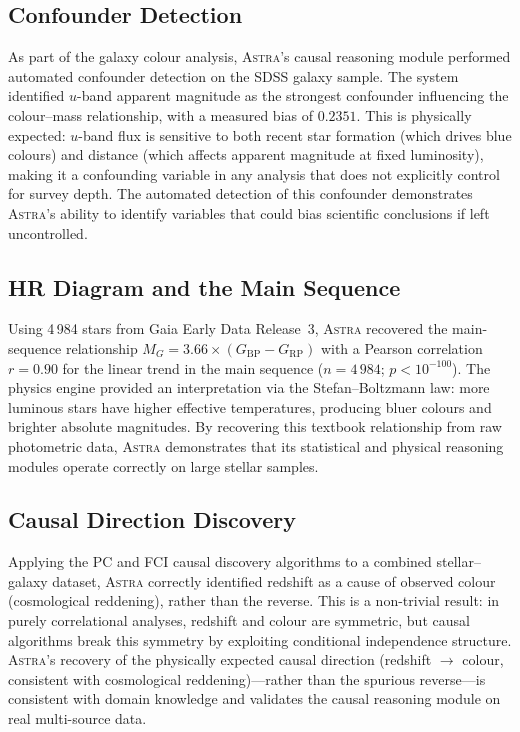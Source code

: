 \documentclass[usenatbib]{rasti}
\newcommand{\astra}{\textsc{Astra}\xspace}
\newcommand{\pc}{PC\xspace}
\newcommand{\fci}{FCI\xspace}
\begin{document}
\subsection{Confounder Detection}
\label{sec:live:confounders}

As part of the galaxy colour analysis, \astra's causal reasoning module performed automated confounder detection on the SDSS galaxy sample.
The system identified $u$-band apparent magnitude as the strongest confounder influencing the colour--mass relationship, with a measured bias of $0.2351$.
This is physically expected: $u$-band flux is sensitive to both recent star formation (which drives blue colours) and distance (which affects apparent magnitude at fixed luminosity), making it a confounding variable in any analysis that does not explicitly control for survey depth.
The automated detection of this confounder demonstrates \astra's ability to identify variables that could bias scientific conclusions if left uncontrolled.

\subsection{HR Diagram and the Main Sequence}
\label{sec:live:hr}

Using 4\,984 stars from Gaia Early Data Release~3, \astra recovered the main-sequence relationship $M_{G} = 3.66 \times (G_{\mathrm{BP}} - G_{\mathrm{RP}})$ with a Pearson correlation $r = 0.90$ for the linear trend in the main sequence ($n = 4\,984$; $p < 10^{-100}$).
The physics engine provided an interpretation via the Stefan--Boltzmann law: more luminous stars have higher effective temperatures, producing bluer colours and brighter absolute magnitudes.
By recovering this textbook relationship from raw photometric data, \astra demonstrates that its statistical and physical reasoning modules operate correctly on large stellar samples.

\subsection{Causal Direction Discovery}
\label{sec:live:causal}

Applying the \pc and \fci \citep{Zhang2008} causal discovery algorithms to a combined stellar--galaxy dataset, \astra correctly identified redshift as a cause of observed colour (cosmological reddening), rather than the reverse.
This is a non-trivial result: in purely correlational analyses, redshift and colour are symmetric, but causal algorithms break this symmetry by exploiting conditional independence structure.
\astra's recovery of the physically expected causal direction (redshift $\to$ colour, consistent with cosmological reddening)---rather than the spurious reverse---is consistent with domain knowledge and validates the causal reasoning module on real multi-source data.
\end{document}
